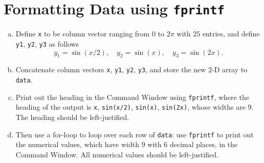 \section{Formatting Data using \lstinline[style=MATLAB]{fprintf}}
\begin{enumerate}[(a)]
    \item Define \verb|x| to be column vector ranging from $0$ to $2 \pi$ with $25$ entries, and define \verb|y1|, \verb|y2|, \verb|y3| as follows
        $$
        y_1 = \sin(x/2), \quad
        y_2 = \sin(x), \quad
        y_3 = \sin(2x).
        $$ \item Concatenate column vectors \verb|x|, \verb|y1|, \verb|y2|, \verb|y3|, and store the new 2-D array to \verb|data|.
    \item Print out the heading in the Command Window using \verb|fprintf|, where the heading of the output is \verb|x|, \verb|sin(x/2)|, \verb|sin(x)|, \verb|sin(2x)|, whose widths are $9$. The heading should be left-justified.
    \item Then use a for-loop to loop over each row of \verb|data|: use \verb|fprintf| to print out the numerical values, which have width $9$ with $6$ decimal places, in the Command Window. All numerical values should be left-justified.
\end{enumerate}

